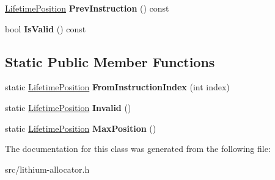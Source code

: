 \begin{DoxyCompactItemize}
\item 
\hypertarget{classv8_1_1internal_1_1_lifetime_position_a8673fbe3f9c1751d76a74920c524948b}{}\hyperlink{classv8_1_1internal_1_1_lifetime_position}{Lifetime\+Position} {\bfseries Prev\+Instruction} () const \label{classv8_1_1internal_1_1_lifetime_position_a8673fbe3f9c1751d76a74920c524948b}

\item 
\hypertarget{classv8_1_1internal_1_1_lifetime_position_aba12f6295305aaee8e589f5a158e1d00}{}bool {\bfseries Is\+Valid} () const \label{classv8_1_1internal_1_1_lifetime_position_aba12f6295305aaee8e589f5a158e1d00}

\end{DoxyCompactItemize}
\subsection*{Static Public Member Functions}
\begin{DoxyCompactItemize}
\item 
\hypertarget{classv8_1_1internal_1_1_lifetime_position_ac4b9a791bc55646e45284a74d932dd6b}{}static \hyperlink{classv8_1_1internal_1_1_lifetime_position}{Lifetime\+Position} {\bfseries From\+Instruction\+Index} (int index)\label{classv8_1_1internal_1_1_lifetime_position_ac4b9a791bc55646e45284a74d932dd6b}

\item 
\hypertarget{classv8_1_1internal_1_1_lifetime_position_aa06cda95a32c3b1a18ed08d82daacb8a}{}static \hyperlink{classv8_1_1internal_1_1_lifetime_position}{Lifetime\+Position} {\bfseries Invalid} ()\label{classv8_1_1internal_1_1_lifetime_position_aa06cda95a32c3b1a18ed08d82daacb8a}

\item 
\hypertarget{classv8_1_1internal_1_1_lifetime_position_a26a6570b7b12c52d5e301f1c55c6780c}{}static \hyperlink{classv8_1_1internal_1_1_lifetime_position}{Lifetime\+Position} {\bfseries Max\+Position} ()\label{classv8_1_1internal_1_1_lifetime_position_a26a6570b7b12c52d5e301f1c55c6780c}

\end{DoxyCompactItemize}


The documentation for this class was generated from the following file\+:\begin{DoxyCompactItemize}
\item 
src/lithium-\/allocator.\+h\end{DoxyCompactItemize}
